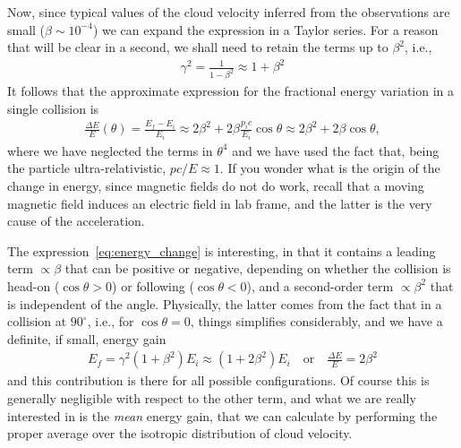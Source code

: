 Now, since typical values of the cloud velocity inferred from the observations are
small ($\beta \sim 10^{-4}$) we can expand the expression in a Taylor series. For a
reason that will be clear in a second, we shall need to retain the terms up to $\beta^2$,
i.e.,
\begin{align*}
  \gamma^2 = \frac{1}{1 - \beta^2} \approx 1 + \beta^2
\end{align*}
It follows that the approximate expression for the fractional energy variation in
a single collision is
\begin{align}\label{eq:energy_change}
  \frac{\Delta E}{E}(\theta) = \frac{E_f - E_i}{E_i} \approx 2 \beta^2 + 2 \beta \frac{p_i c}{E_i} \cos\theta
  \approx 2 \beta^2 + 2 \beta \cos\theta,
\end{align}
where we have neglected the terms in $\theta^4$ and we have used the fact that, being
the particle ultra-relativistic, $pc/E \approx 1$.
If you wonder what is the origin of the change in energy, since magnetic fields
do not do work, recall that a moving magnetic field induces an electric field in
lab frame, and the latter is the very cause of the acceleration.

The expression~\eqref{eq:energy_change} is interesting, in that it contains a leading
term $\propto \beta$ that can be positive or negative, depending on whether the
collision is head-on ($\cos\theta > 0$) or following ($\cos\theta < 0$), and a
second-order term $\propto \beta^2$ that is independent of the angle.  Physically,
the latter comes from the fact that in a collision at $90^\circ$, i.e., for
$\cos\theta = 0$, things simplifies considerably, and we have a definite, if small,
energy gain
\begin{align*}
  E_f = \gamma^2 (1 + \beta^2) E_i \approx (1 + 2\beta^2)E_i \quad\text{or}\quad
  \frac{\Delta E}{E} = 2\beta^2
\end{align*}
and this contribution is there for all possible configurations. Of course this is
generally negligible with respect to the other term, and what we are really interested
in is the \emph{mean} energy gain, that we can calculate by performing the proper
average over the isotropic distribution of cloud velocity.

